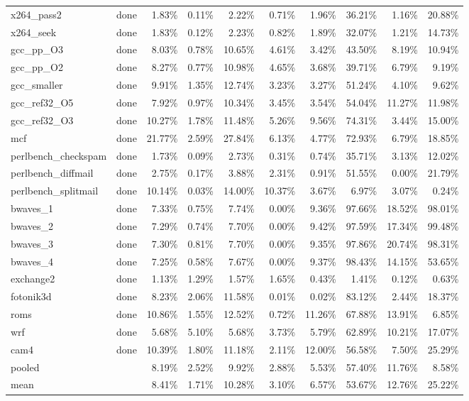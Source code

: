 \documentclass[10pt,a4paper,landscape]{article}
\begin{document}
{\begin{longtable}{llrrrrrrrr}
x264\_pass2 & done & 1.83\% & 0.11\% & 2.22\% & 0.71\% & 1.96\% & 36.21\% & 1.16\% & 20.88\% \\
x264\_seek & done & 1.83\% & 0.12\% & 2.23\% & 0.82\% & 1.89\% & 32.07\% & 1.21\% & 14.73\% \\
gcc\_pp\_O3 & done & 8.03\% & 0.78\% & 10.65\% & 4.61\% & 3.42\% & 43.50\% & 8.19\% & 10.94\% \\
gcc\_pp\_O2 & done & 8.27\% & 0.77\% & 10.98\% & 4.65\% & 3.68\% & 39.71\% & 6.79\% & 9.19\% \\
gcc\_smaller & done & 9.91\% & 1.35\% & 12.74\% & 3.23\% & 3.27\% & 51.24\% & 4.10\% & 9.62\% \\
gcc\_ref32\_O5 & done & 7.92\% & 0.97\% & 10.34\% & 3.45\% & 3.54\% & 54.04\% & 11.27\% & 11.98\% \\
gcc\_ref32\_O3 & done & 10.27\% & 1.78\% & 11.48\% & 5.26\% & 9.56\% & 74.31\% & 3.44\% & 15.00\% \\
mcf & done & 21.77\% & 2.59\% & 27.84\% & 6.13\% & 4.77\% & 72.93\% & 6.79\% & 18.85\% \\
perlbench\_checkspam & done & 1.73\% & 0.09\% & 2.73\% & 0.31\% & 0.74\% & 35.71\% & 3.13\% & 12.02\% \\
perlbench\_diffmail & done & 2.75\% & 0.17\% & 3.88\% & 2.31\% & 0.91\% & 51.55\% & 0.00\% & 21.79\% \\
perlbench\_splitmail & done & 10.14\% & 0.03\% & 14.00\% & 10.37\% & 3.67\% & 6.97\% & 3.07\% & 0.24\% \\
bwaves\_1 & done & 7.33\% & 0.75\% & 7.74\% & 0.00\% & 9.36\% & 97.66\% & 18.52\% & 98.01\% \\
bwaves\_2 & done & 7.29\% & 0.74\% & 7.70\% & 0.00\% & 9.42\% & 97.59\% & 17.34\% & 99.48\% \\
bwaves\_3 & done & 7.30\% & 0.81\% & 7.70\% & 0.00\% & 9.35\% & 97.86\% & 20.74\% & 98.31\% \\
bwaves\_4 & done & 7.25\% & 0.58\% & 7.67\% & 0.00\% & 9.37\% & 98.43\% & 14.15\% & 53.65\% \\
exchange2 & done & 1.13\% & 1.29\% & 1.57\% & 1.65\% & 0.43\% & 1.41\% & 0.12\% & 0.63\% \\
fotonik3d & done & 8.23\% & 2.06\% & 11.58\% & 0.01\% & 0.02\% & 83.12\% & 2.44\% & 18.37\% \\
roms & done & 10.86\% & 1.55\% & 12.52\% & 0.72\% & 11.26\% & 67.88\% & 13.91\% & 6.85\% \\
wrf & done & 5.68\% & 5.10\% & 5.68\% & 3.73\% & 5.79\% & 62.89\% & 10.21\% & 17.07\% \\
cam4 & done & 10.39\% & 1.80\% & 11.18\% & 2.11\% & 12.00\% & 56.58\% & 7.50\% & 25.29\% \\
\midrule
pooled &  & 8.19\% & 2.52\% & 9.92\% & 2.88\% & 5.53\% & 57.40\% & 11.76\% & 8.58\% \\
mean &  & 8.41\% & 1.71\% & 10.28\% & 3.10\% & 6.57\% & 53.67\% & 12.76\% & 25.22\% \\
\end{longtable}
}
\end{document}
